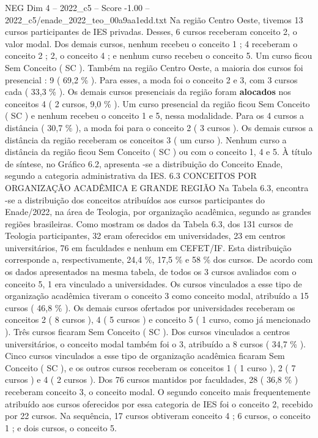 \begin{textsample}{NEG Dim 4 – 2022\_c5 – Score -1.00 – 2022\_c5/enade\_2022\_teo\_00a9aa1edd.txt}
Na região Centro Oeste, tivemos 13 cursos participantes de IES privadas.
Desses, 6 cursos receberam conceito 2, o valor modal.
Dos demais cursos, nenhum recebeu o conceito 1 ; 4 receberam o conceito 2 ; 2, o conceito 4 ; e nenhum curso recebeu o conceito 5.
Um curso ficou Sem Conceito ( SC ).
Também na região Centro Oeste, a maioria dos cursos foi presencial : 9 ( 69,2 \% ).
Para esses, a moda foi o conceito 2 e 3, com 3 cursos cada ( 33,3 \% ).
Os demais cursos presenciais da região foram \textbf{alocados} nos conceitos 4 ( 2 cursos, 9,0 \% ).
Um curso presencial da região ficou Sem Conceito ( SC ) e nenhum recebeu o conceito 1 e 5, nessa modalidade.
Para os 4 cursos a distância ( 30,7 \% ), a moda foi para o conceito 2 ( 3 cursos ).
Os demais cursos a distância da região receberam os conceitos 3 ( um curso ).
Nenhum curso a distância da região ficou Sem Conceito ( SC ) ou com o conceito 1, 4 e 5.
À título de síntese, no Gráfico 6.2, apresenta -se a distribuição do Conceito Enade, segundo a categoria administrativa da IES. 6.3 CONCEITOS POR ORGANIZAÇÃO ACADÊMICA E GRANDE REGIÃO Na Tabela 6.3, encontra -se a distribuição dos conceitos atribuídos aos cursos participantes do Enade/2022, na área de Teologia, por organização acadêmica, segundo as grandes regiões brasileiras.
Como mostram os dados da Tabela 6.3, dos 131 cursos de Teologia participantes, 32 eram oferecidos em universidades, 23 em centros universitários, 76 em faculdades e nenhum em CEFET/IF.
Esta distribuição corresponde a, respectivamente, 24,4 \%, 17,5 \% e 58 \% dos cursos.
De acordo com os dados apresentados na mesma tabela, de todos os 3 cursos avaliados com o conceito 5, 1 era vinculado a universidades.
Os cursos vinculados a esse tipo de organização acadêmica tiveram o conceito 3 como conceito modal, atribuído a 15 cursos ( 46,8 \% ).
Os demais cursos ofertados por universidades receberam os conceitos 2 ( 8 cursos ), 4 ( 5 cursos ) e conceito 5 ( 1 curso, como já mencionado ).
Três cursos ficaram Sem Conceito ( SC ).
Dos cursos vinculados a centros universitários, o conceito modal também foi o 3, atribuído a 8 cursos ( 34,7 \% ).
Cinco cursos vinculados a esse tipo de organização acadêmica ficaram Sem Conceito ( SC ), e os outros cursos receberam os conceitos 1 ( 1 curso ), 2 ( 7 cursos ) e 4 ( 2 cursos ).
Dos 76 cursos mantidos por faculdades, 28 ( 36,8 \% ) receberam conceito 3, o conceito modal.
O segundo conceito mais frequentemente atribuído aos cursos oferecidos por essa categoria de IES foi o conceito 2, recebido por 22 cursos.
Na sequência, 17 cursos obtiveram conceito 4 ; 6 cursos, o conceito 1 ; e dois cursos, o conceito 5.

\end{textsample}
